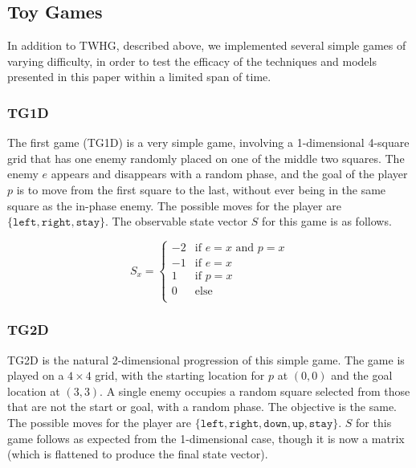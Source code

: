 \documentclass[9pt,journal]{IEEEtran}
\begin{document}
\subsection{Toy Games}

In addition to TWHG, described above, we implemented several simple games of varying difficulty, in order to test the efficacy of the techniques and models presented in this paper within a limited span of time.

\subsubsection{TG1D}

The first game (TG1D) is a very simple game, involving a 1-dimensional 4-square grid that has one enemy randomly placed on one of the middle two squares. The enemy $e$ appears and disappears with a random phase, and the goal of the player $p$ is to move from the first square to the last, without ever being in the same square as the in-phase enemy. The possible moves for the player are $\{\texttt{left}, \texttt{right}, \texttt{stay}\}$. The observable state vector $S$ for this game is as follows.

\begin{equation*}
  S_{x} =
  \begin{cases}
    -2 & \text{if } e = x \text{ and } p = x \\
    -1 & \text{if } e = x \\
    1 & \text{if }  p = x \\
    0 & \text{else} \\
  \end{cases}
\end{equation*}

\subsubsection{TG2D}

TG2D is the natural 2-dimensional progression of this simple game. The game is played on a $4 \times 4$ grid, with the starting location for $p$ at $(0, 0)$ and the goal location at $(3, 3)$. A single enemy occupies a random square selected from those that are not the start or goal, with a random phase. The objective is the same.  The possible moves for the player are $\{\texttt{left}, \texttt{right}, \texttt{down}, \texttt{up}, \texttt{stay}\}$. $S$ for this game follows as expected from the 1-dimensional case, though it is now a matrix (which is flattened to produce the final state vector).
\end{document}
